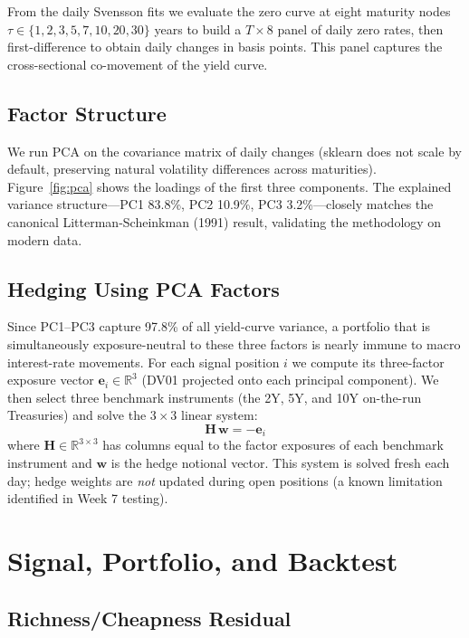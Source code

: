 \documentclass[11pt]{article}
\begin{document}
From the daily Svensson fits we evaluate the zero curve at eight maturity
nodes $\tau \in \{1, 2, 3, 5, 7, 10, 20, 30\}$ years to build a
$T \times 8$ panel of daily zero rates, then first-difference to obtain daily
changes in basis points. This panel captures the cross-sectional co-movement
of the yield curve.

\subsection{Factor Structure}

We run PCA on the covariance matrix of daily changes (sklearn does not scale
by default, preserving natural volatility differences across maturities).
Figure~\ref{fig:pca} shows the loadings of the first three components.
The explained variance structure---PC1 83.8\%, PC2 10.9\%, PC3 3.2\%---closely
matches the canonical Litterman-Scheinkman (1991) result, validating the
methodology on modern data.

\subsection{Hedging Using PCA Factors}

Since PC1--PC3 capture 97.8\% of all yield-curve variance, a portfolio that
is simultaneously exposure-neutral to these three factors is nearly immune to
macro interest-rate movements. For each signal position $i$ we compute its
three-factor exposure vector $\mathbf{e}_i \in \mathbb{R}^3$ (DV01 projected
onto each principal component). We then select three benchmark instruments
(the 2Y, 5Y, and 10Y on-the-run Treasuries) and solve the $3 \times 3$ linear
system:
\begin{equation}
  \mathbf{H}\,\mathbf{w} = -\mathbf{e}_i
\end{equation}
where $\mathbf{H} \in \mathbb{R}^{3 \times 3}$ has columns equal to the
factor exposures of each benchmark instrument and $\mathbf{w}$ is the hedge
notional vector. This system is solved fresh each day; hedge weights are
\emph{not} updated during open positions (a known limitation identified in
Week 7 testing).

\section{Signal, Portfolio, and Backtest}

\subsection{Richness/Cheapness Residual}
\end{document}
